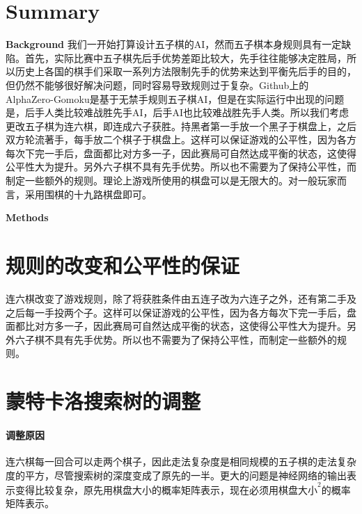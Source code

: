 \documentclass[portrait]{a0poster}	%
\begin{document}
\begin{multicols}{2}


\section*{Summary}

\noindent\textbf{Background}
我们一开始打算设计五子棋的AI，然而五子棋本身规则具有一定缺陷。首先，实际比赛中五子棋先后手优势差距比较大，先手往往能够决定胜局，所以历史上各国的棋手们采取一系列方法限制先手的优势来达到平衡先后手的目的，但仍然不能够很好解决问题，同时容易导致规则过于复杂。Github上的AlphaZero-Gomoku是基于无禁手规则五子棋AI，但是在实际运行中出现的问题是，后手人类比较难战胜先手AI，后手AI也比较难战胜先手人类。所以我们考虑更改五子棋为连六棋，即连成六子获胜。持黑者第一手放一个黑子于棋盘上，之后双方轮流著手，每手放二个棋子于棋盘上。这样可以保证游戏的公平性，因为各方每次下完一手后，盘面都比对方多一子，因此赛局可自然达成平衡的状态，这使得公平性大为提升。另外六子棋不具有先手优势。所以也不需要为了保持公平性，而制定一些额外的规则。理论上游戏所使用的棋盘可以是无限大的。对一般玩家而言，采用围棋的十九路棋盘即可。\par

\noindent\textbf{Methods} 
\section{规则的改变和公平性的保证}
连六棋改变了游戏规则，除了将获胜条件由五连子改为六连子之外，还有第二手及之后每一手投两个子。这样可以保证游戏的公平性，因为各方每次下完一手后，盘面都比对方多一子，因此赛局可自然达成平衡的状态，这使得公平性大为提升。另外六子棋不具有先手优势。所以也不需要为了保持公平性，而制定一些额外的规则。

\section{蒙特卡洛搜索树的调整}
\paragraph{调整原因}
连六棋每一回合可以走两个棋子，因此走法复杂度是相同规模的五子棋的走法复杂度的平方，尽管搜索树的深度变成了原先的一半。更大的问题是神经网络的输出表示变得比较复杂，原先用棋盘大小的概率矩阵表示，现在必须用$\text{棋盘大小}^2$的概率矩阵表示。

\end{multicols}
\end{document}
